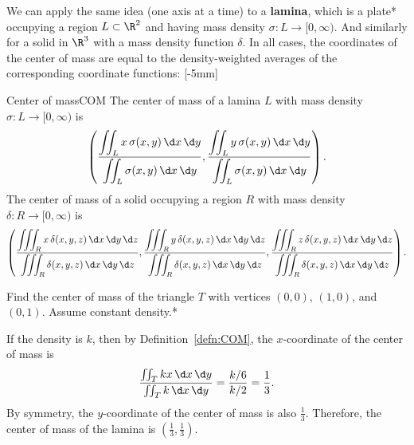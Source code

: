 \documentclass{watsonbook}
\begin{document}
We can apply the same idea (one axis at a time) to a \textbf{lamina},
which is a plate* occupying a region $L\subset \R^2$ and having mass
density $\sigma:L \to [0,\infty)$. And similarly for a solid in $\R^3$
with a mass density function $\delta$. In all cases, the coordinates
of the center of mass are equal to the density-weighted averages of
the corresponding coordinate functions: [-5mm]

\begin{defn}{Center of mass}{COM}
  The {center of mass} of a lamina $L$ with mass density $\sigma:L \to [0,\infty)$ is
  \[
    \left(
      \frac{\displaystyle{\iint_L x \, \sigma(x,y) \, \d x \, \d y}}
      {\displaystyle{\iint_L \sigma(x,y) \, \d x \, \d y}},
      \frac{\displaystyle{\iint_L y \, \sigma(x,y) \, \d x \, \d y}}
      {\displaystyle{\iint_L \sigma(x,y) \, \d x \, \d y}}
    \right). 
  \]
  The center of mass of a solid occupying a region $R$ with mass
  density $\delta:R \to [0,\infty)$ is
  \[
    \left(
      \frac{\displaystyle{\iiint_R x \, \delta(x,y,z) \, \d x \, \d y \, \d z}}
      {\displaystyle{\iiint_R \delta(x,y,z) \, \d x \, \d y \, \d z}},
      \frac{\displaystyle{\iiint_R y \, \delta(x,y,z) \, \d x \, \d y \, \d z}}
      {\displaystyle{\iiint_R \delta(x,y,z) \, \d x \, \d y \, \d z}},
      \frac{\displaystyle{\iiint_R z \, \delta(x,y,z) \, \d x \, \d y \, \d z}}
      {\displaystyle{\iiint_R \delta(x,y,z) \, \d x \, \d y \, \d z}}
    \right). 
  \]
\end{defn}

\begin{example}{}{}
  Find the center of mass of the triangle $T$ with vertices $(0,0)$,
  $(1,0)$, and $(0,1)$. Assume constant density.* 
\end{example}

\begin{solution}
  If the density is $k$, then by Definition~\ref{defn:COM}, the
  $x$-coordinate of the center of mass is
  \[
    \frac{\iint_T kx \, \d x \, \d y}{\iint_T k \, \d x \, \d y}
    =\frac{k/6}{k/2} = \frac{1}{3}.
  \]
  By symmetry, the $y$-coordinate of the center of mass is also
  $\tfrac{1}{3}$. Therefore, the center of mass of the lamina is
  $\boxed{\left(\tfrac{1}{3}, \tfrac{1}{3}\right)}$.
\end{solution}
\end{document}
